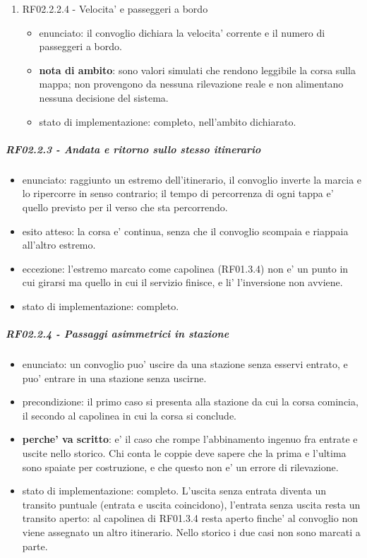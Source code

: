 \documentclass[11pt]{article}
\begin{document}
\begin{enumerate}
\begin{itemize}
\item stato di implementazione: completo; a database la colonna dello stato accetta solo cinque
valori, uno per ogni stato del vocabolario con i nomi del database (\texttt{attivo}, \texttt{fermo}, \texttt{rotto},
\texttt{in manutenzione} per SOPPRESSO, \texttt{capolinea}). Quei valori sono un riassunto: la telemetria porta anche condizione e fase
del viaggio, ed e' quello che l'interfaccia mostra.
\end{itemize}
\item RF02.2.2.4 - Velocita' e passeggeri a bordo
\label{sec:org0e61cc4}
\begin{itemize}
\item enunciato: il convoglio dichiara la velocita' corrente e il numero di passeggeri a bordo.
\item \textbf{nota di ambito}: sono valori simulati che rendono leggibile la corsa sulla mappa; non provengono
da nessuna rilevazione reale e non alimentano nessuna decisione del sistema.
\item stato di implementazione: completo, nell'ambito dichiarato.
\end{itemize}
\end{enumerate}
\subparagraph{RF02.2.3 - Andata e ritorno sullo stesso itinerario}
\label{sec:org9665b02}
\begin{itemize}
\item enunciato: raggiunto un estremo dell'itinerario, il convoglio inverte la marcia e lo ripercorre in
senso contrario; il tempo di percorrenza di ogni tappa e' quello previsto per il verso che sta
percorrendo.
\item esito atteso: la corsa e' continua, senza che il convoglio scompaia e riappaia all'altro estremo.
\item eccezione: l'estremo marcato come capolinea (RF01.3.4) non e' un punto in cui girarsi ma quello in
cui il servizio finisce, e li' l'inversione non avviene.
\item stato di implementazione: completo.
\end{itemize}
\subparagraph{RF02.2.4 - Passaggi asimmetrici in stazione}
\label{sec:orgef2763e}
\begin{itemize}
\item enunciato: un convoglio puo' uscire da una stazione senza esservi entrato, e puo' entrare in una
stazione senza uscirne.
\item precondizione: il primo caso si presenta alla stazione da cui la corsa comincia, il secondo al
capolinea in cui la corsa si conclude.
\item \textbf{perche' va scritto}: e' il caso che rompe l'abbinamento ingenuo fra entrate e uscite nello
storico. Chi conta le coppie deve sapere che la prima e l'ultima sono spaiate per costruzione, e
che questo non e' un errore di rilevazione.
\item stato di implementazione: completo. L'uscita senza entrata diventa un transito puntuale (entrata e
uscita coincidono), l'entrata senza uscita resta un transito aperto: al capolinea di RF01.3.4 resta
aperto finche' al convoglio non viene assegnato un altro itinerario. Nello storico i due casi non
sono marcati a parte.
\end{itemize}
\end{document}
